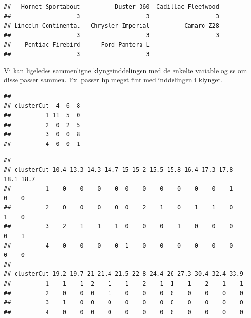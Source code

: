 \documentclass[]{book}
\newenvironment{Shaded}{\begin{snugshade}}{\end{snugshade}}
\newcommand{\KeywordTok}[1]{\textcolor[rgb]{0.13,0.29,0.53}{\textbf{#1}}}
\newcommand{\NormalTok}[1]{#1}
\newcommand{\OperatorTok}[1]{\textcolor[rgb]{0.81,0.36,0.00}{\textbf{#1}}}
\begin{document}
\begin{verbatim}
##   Hornet Sportabout          Duster 360  Cadillac Fleetwood 
##                   3                   3                   3 
## Lincoln Continental   Chrysler Imperial          Camaro Z28 
##                   3                   3                   3 
##    Pontiac Firebird      Ford Pantera L 
##                   3                   3
\end{verbatim}

Vi kan ligeledes sammenligne klyngeinddelingen med de enkelte variable og se om disse passer sammen. Fx. passer hp meget fint med inddelingen i klynger.

\begin{Shaded}
\end{Shaded}

\begin{verbatim}
##           
## clusterCut  4  6  8
##          1 11  5  0
##          2  0  2  5
##          3  0  0  8
##          4  0  0  1
\end{verbatim}

\begin{Shaded}
\end{Shaded}

\begin{verbatim}
##           
## clusterCut 10.4 13.3 14.3 14.7 15 15.2 15.5 15.8 16.4 17.3 17.8 18.1 18.7
##          1    0    0    0    0  0    0    0    0    0    0    1    0    0
##          2    0    0    0    0  0    2    1    0    1    1    0    1    0
##          3    2    1    1    1  0    0    0    1    0    0    0    0    1
##          4    0    0    0    0  1    0    0    0    0    0    0    0    0
##           
## clusterCut 19.2 19.7 21 21.4 21.5 22.8 24.4 26 27.3 30.4 32.4 33.9
##          1    1    1  2    1    1    2    1  1    1    2    1    1
##          2    0    0  0    1    0    0    0  0    0    0    0    0
##          3    1    0  0    0    0    0    0  0    0    0    0    0
##          4    0    0  0    0    0    0    0  0    0    0    0    0
\end{verbatim}

\begin{Shaded}
\end{Shaded}
\end{document}
